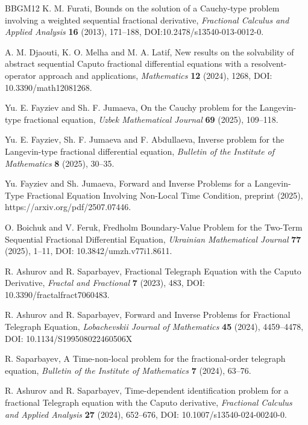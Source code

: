 \documentclass{amsart}
\numberwithin{equation}{section}
\begin{document}
\begin{thebibliography}{BBGM12}
K. M. Furati, Bounds on the solution of a Cauchy-type problem involving a weighted sequential fractional derivative, \emph{Fractional Calculus and Applied Analysis} \textbf{16} (2013), 171--188, DOI:10.2478/s13540-013-0012-0.

A. M. Djaouti, K. O. Melha and M. A. Latif, New results on the solvability of abstract sequential Caputo fractional differential equations with a resolvent-operator approach and applications, \emph{Mathematics} \textbf{12} (2024), 1268, DOI: 10.3390/math12081268.

Yu. E. Fayziev and Sh. F. Jumaeva, On the Cauchy problem for the Langevin-type fractional equation, \emph{Uzbek Mathematical Journal} \textbf{69} (2025), 109--118.

Yu. E. Fayziev, Sh. F. Jumaeva and F. Abdullaeva, Inverse problem for the Langevin-type fractional differential equation, \emph{Bulletin of the Institute of Mathematics} \textbf{8} (2025), 30--35.

Yu. Fayziev and Sh. Jumaeva, Forward and Inverse Problems for a Langevin-Type Fractional Equation Involving Non-Local Time Condition, preprint (2025), https://arxiv.org/pdf/2507.07446.

O. Boichuk and V. Feruk, Fredholm Boundary-Value Problem for the Two-Term Sequential Fractional Differential Equation, \emph{Ukrainian Mathematical Journal} \textbf{77} (2025), 1--11, DOI: 10.3842/umzh.v77i1.8611.

R. Ashurov and R. Saparbayev, Fractional Telegraph Equation with the Caputo Derivative, \emph{Fractal and Fractional} \textbf{7} (2023), 483, DOI: 10.3390/fractalfract7060483.

R. Ashurov and R. Saparbayev, Forward and Inverse Problems for Fractional Telegraph Equation, \emph{Lobachevskii Journal of Mathematics} \textbf{45} (2024), 4459--4478, DOI: 10.1134/S199508022460506X

R. Saparbayev, A Time-non-local problem for the fractional-order telegraph equation, \emph{Bulletin of the Institute of Mathematics} \textbf{7} (2024), 63--76.

R. Ashurov and R. Saparbayev, Time-dependent identification problem for a fractional Telegraph equation with the Caputo derivative, \emph{Fractional Calculus and Applied Analysis} \textbf{27} (2024), 652--676, DOI: 10.1007/s13540-024-00240-0.


\end{thebibliography}
\end{document}
